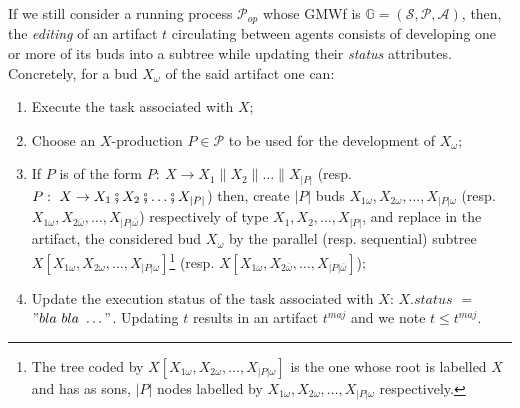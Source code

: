 \label{chap3:sec:artifact-edition}
If we still consider a running process $\mathcal{P}_{op}$ whose GMWf is $\mathbb{G}=\left(\mathcal{S},\mathcal{P},\mathcal{A}\right)$, then, the \textit{editing} of an artifact $t$ circulating between agents consists of developing one or more of its buds into a subtree while updating their \textit{status} attributes. Concretely, for a bud ${X_\omega}$ of the said artifact one can:
\begin{enumerate}
\item Execute the task associated with $X$; 

\item Choose an $X$-production $P \in \mathcal{P}$ to be used for the development of ${X_\omega}$;

\item If $P$ is of the form $P:~X \rightarrow X_1 \parallel X_2 \parallel \ldots \parallel X_{|P|}$ (resp. $P:~X \rightarrow X_1 \fatsemi X_2 \fatsemi \ldots \fatsemi X_{|P|}$) then, create $|P|$ buds $X_{1\omega}, X_{2\omega}, \ldots, X_{|P|\omega}$ (resp. $X_{1\omega}, X_{2\overline{\omega}}, \ldots, X_{|P|\overline{\omega}}$) respectively of type $X_1, X_2, \ldots , X_{|P|}$, and replace in the artifact, the considered bud ${X_\omega}$ by the parallel (resp. sequential) subtree $X[X_{1\omega}, X_{2\omega}, \ldots, X_{|P|\omega}]$\footnote{The tree coded by $X[X_{1\omega}, X_{2\omega}, \ldots, X_{|P|\omega}]$ is the one whose root is labelled $X$ and has as sons, $|P|$ nodes labelled by $X_{1\omega}, X_{2\omega}, \ldots, X_{|P|\omega}$ respectively.} (resp. $X[X_{1\omega}, X_{2\overline{\omega}}, \ldots, X_{|P|\overline{\omega}}]$);

\item Update the execution status of the task associated with $X$: $X.status$ $=$ $"bla~bla~\ldots"$.
Updating $t$ results in an artifact $t^{maj}$ and we note $t \leq t^{maj}$.
\end{enumerate}

